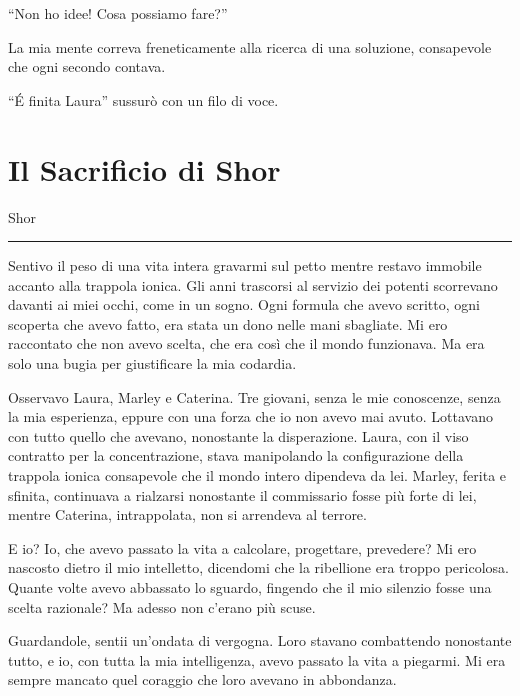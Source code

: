 \begin{dialogue}
 \enquote{Non ho idee! Cosa possiamo fare?}
\end{dialogue}

La mia mente correva freneticamente alla ricerca di una soluzione, consapevole che ogni secondo contava.

\begin{dialogue}
 \enquote{\'E finita Laura} sussurò con un filo di voce.
\end{dialogue}


\section{Il Sacrificio di Shor}

\vspace{1em}
\begin{center}Shor\end{center}
\hrule
\vspace{1em}

Sentivo il peso di una vita intera gravarmi sul petto mentre restavo immobile accanto alla trappola ionica. Gli anni trascorsi al servizio dei potenti scorrevano davanti ai miei occhi, come in un sogno. Ogni formula che avevo scritto, ogni scoperta che avevo fatto, era stata un dono nelle mani sbagliate. Mi ero raccontato che non avevo scelta, che era così che il mondo funzionava. Ma era solo una bugia per giustificare la mia codardia.

Osservavo Laura, Marley e Caterina. Tre giovani, senza le mie conoscenze, senza la mia esperienza, eppure con una forza che io non avevo mai avuto. Lottavano con tutto quello che avevano, nonostante la disperazione. Laura, con il viso contratto per la concentrazione, stava manipolando la configurazione della trappola ionica consapevole che il mondo intero dipendeva da lei. Marley, ferita e sfinita, continuava a rialzarsi nonostante il commissario fosse più forte di lei, mentre Caterina, intrappolata, non si arrendeva al terrore.

E io? Io, che avevo passato la vita a calcolare, progettare, prevedere? Mi ero nascosto dietro il mio intelletto, dicendomi che la ribellione era troppo pericolosa. Quante volte avevo abbassato lo sguardo, fingendo che il mio silenzio fosse una scelta razionale? Ma adesso non c’erano più scuse.

Guardandole, sentii un’ondata di vergogna. Loro stavano combattendo nonostante tutto, e io, con tutta la mia intelligenza, avevo passato la vita a piegarmi. Mi era sempre mancato quel coraggio che loro avevano in abbondanza.

